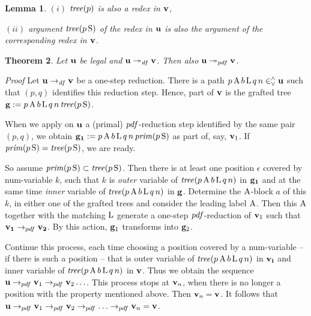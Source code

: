 \documentclass{article}
\theoremstyle{plain}
\newtheorem{The}{Theorem}[section]
\newtheorem{Lem}[The]{Lemma}
\theoremstyle{definition}
\begin{document}
{\begin{Lem}
$(i)$ ${\it tree}(p)$ is also a redex in ${\bf v}$,

$(ii)$ argument ${\it tree}(p \, {\rm S})$ of  the redex in ${\bf u}$ is also the argument of the corresponding redex in ${\bf v}$.
\end{Lem}

\begin{The}\label{ThePdfDf}
Let ${\bf u}$ be legal and ${\bf u} \twoheadrightarrow_{\it df} {\bf v}$. Then also ${\bf u} \twoheadrightarrow_{\it pdf} {\bf v}$.
\end{The}

{\it Proof\/} Let ${\bf u} \rightarrow_{\it df} {\bf v}$ be a one-step reduction. There is a path $p \, {\rm A} \, b \, {\rm L} \, q \, n \in^\wedge_\vee {\bf u}$ such that $(p, q)$ identifies this reduction step. Hence, part of ${\bf v}$ is the grafted tree ${\bf g} := p \, {\rm A} \, b \, {\rm L} \, q \, n \, {\it tree\/}(p \, {\rm S})$.

When we apply on ${\bf u}$ a (primal) ${\it pdf}$-reduction step identified by the same pair $(p, q)$, we obtain ${\bf g_1} : = p \, {\rm A} \, b \, {\rm L} \, q \, n \, {\it prim\/}(p \, {\rm S})$ as part of, say, ${{\bf v}}_1$. If ${\it prim\/}(p \, {\rm S}) = {\it tree\/}(p \, {\rm S})$, we are ready.

So assume  ${\it prim\/}(p \, {\rm S}) \subset {\it tree\/}(p \, {\rm S})$.  Then there is at least one position $\epsilon$ covered by num-variable $k$, such that $k$ is {\em outer\/} variable of ${\it tree\/}(p \, {\rm A} \, b \, {\rm L} \, q \, n)$ in ${\bf g_1}$
and at the same time {\em inner\/} variable of ${\it tree\/}(p \, {\rm A} \, b \, {\rm L} \, q \, n)$ in ${\bf g}$.
Determine the ${\rm A}$-block $a$ of this $k$, in either one of the grafted trees and consider the leading label ${\rm A}$.
Then this ${\rm A}$ together with the matching ${\rm L}$ generate a one-step ${\it pdf}$-reduction of ${\bf v}_1$ such that ${\bf v_1} \rightarrow_{pdf} {\bf v_2}$. By this action, ${\bf g}_1$ transforms into ${\bf g}_2$.

Continue this process, each time choosing a position covered by a num-variable -- if there is such a position -- that is outer variable of ${\it tree\/}(p \, {\rm A} \, b \, {\rm L} \, q \, n)$ in ${\bf v_i}$ and inner variable of ${\it tree\/}(p \, {\rm A} \, b \, {\rm L} \, q \, n)$ in ${\bf v}$. Thus we obtain the sequence ${\bf u} \rightarrow_{pdf} {\bf v}_1 \rightarrow_{pdf} {\bf v}_2 \ldots$. This process stops at ${\bf v}_n$, when there is no longer a position with the property mentioned above. Then ${\bf v}_n = {\bf v}$. It follows that ${\bf u} \rightarrow_{pdf} {\bf v}_1 \rightarrow_{pdf} {\bf v}_2 \rightarrow_{pdf} \ldots \rightarrow_{pdf} {\bf v}_n = {\bf v}$.

}
\end{document}
